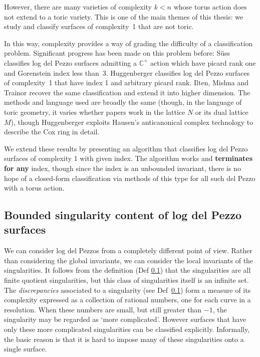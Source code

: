 \documentclass[12pt]{amsart}
\theoremstyle{definition}
\theoremstyle{definition}
\theoremstyle{definition}
\theoremstyle{definition}
\theoremstyle{definition}
\theoremstyle{definition}
\theoremstyle{definition}
\theoremstyle{definition}
\begin{document}
However, there are many varieties of complexity $k<n$ whose torus action does not extend to a toric variety. This is one of the main themes of this thesis: we study
and classify surfaces of complexity~1 that are not toric.

In this way, complexity provides a way of grading the difficulty of a classification problem. Significant progress has been made on this problem before: S\"{u}ss \cite{Suss} classifies log del Pezzo surfaces admitting a $\mathbb{C}^\times$ action which have picard rank one and Gorenstein index less than~3. Huggenberger \cite{Huggenberger} classifies log del Pezzo surfaces of complexity~1 that have index 1 and arbitrary picard rank. Ilten, Mishna and Trainor \cite{IMT} recover the same classification and extend it into higher dimension. The methods and language used are broadly the same (though, in the language of toric geometry, it varies whether papers work in the lattice $N$ or its dual lattice $M$), though Huggenberger exploits Hausen's anticanonical complex technology to describe the Cox ring in detail. 

We extend these results by presenting an algorithm that classifies
log del Pezzo surfaces of complexity 1 with given index.
The algorithm works and \textbf{terminates for any} index, 
though since the index is an unbounded invariant, there is no hope of 
a closed-form classification via methods of this type for all such del Pezzo with a torus action.



\subsection{Bounded singularity content of log del Pezzo surfaces}

We can consider log del Pezzos from a completely different point of view. Rather than considering the global invariants, we can consider the local invariants of the singularities. 
It follows from the definition (Def \ref{}) that the singularities
are all finite quotient singularities, but this class of singularities itself is an infinite set. 
The {\em discrepancies} associated to a singularity (see Def~\ref{}) form a measure of
its complexity expressed as a collection of rational numbers, one for each curve in a resolution. 
When these numbers are small, but still greater than $-1$, the singularity may be regarded as `more complicated'. 
However surfaces that have only these more complicated singularities can be classified explicitly. Informally,
the basic reason is that it is hard to impose many of these singularities onto a single surface.
\end{document}
